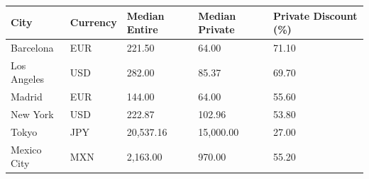 \begin{tabular}{lllll}
\toprule
City & Currency & Median Entire & Median Private & Private Discount (\%) \\
\midrule
Barcelona & EUR & 221.50 & 64.00 & 71.10 \\
Los Angeles & USD & 282.00 & 85.37 & 69.70 \\
Madrid & EUR & 144.00 & 64.00 & 55.60 \\
New York & USD & 222.87 & 102.96 & 53.80 \\
Tokyo & JPY & 20,537.16 & 15,000.00 & 27.00 \\
Mexico City & MXN & 2,163.00 & 970.00 & 55.20 \\
\bottomrule
\end{tabular}

